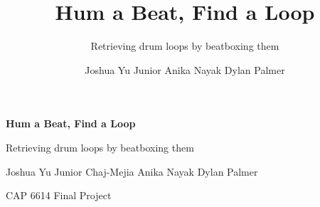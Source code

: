 \documentclass[aspectratio=169,11pt]{beamer}
\title{Hum a Beat, Find a Loop}
\subtitle{Retrieving drum loops by beatboxing them}
\author{Joshua Yu \quad Junior \quad Anika Nayak \quad Dylan Palmer}
\date{}
\begin{document}
{

\begin{frame}[plain]
    \centering

    \vspace*{1.5cm}

    {\fontsize{31}{36}\selectfont\bfseries
    Hum a Beat, Find a Loop
    \par}

    \vspace{0.15cm}

    {\fontsize{20}{25}\selectfont
    Retrieving drum loops by beatboxing them
    \par}

    \vspace{0.65cm}

    {\fontsize{13}{16}\selectfont
    Joshua Yu \quad
    Junior Chaj-Mejia \quad
    Anika Nayak \quad
    Dylan Palmer
    \par}

    \vspace{0.25cm}

    {\fontsize{11}{14}\selectfont\color{gray}
    CAP 6614 Final Project
    \par}

    \vfill
\end{frame}
}






\end{document}

